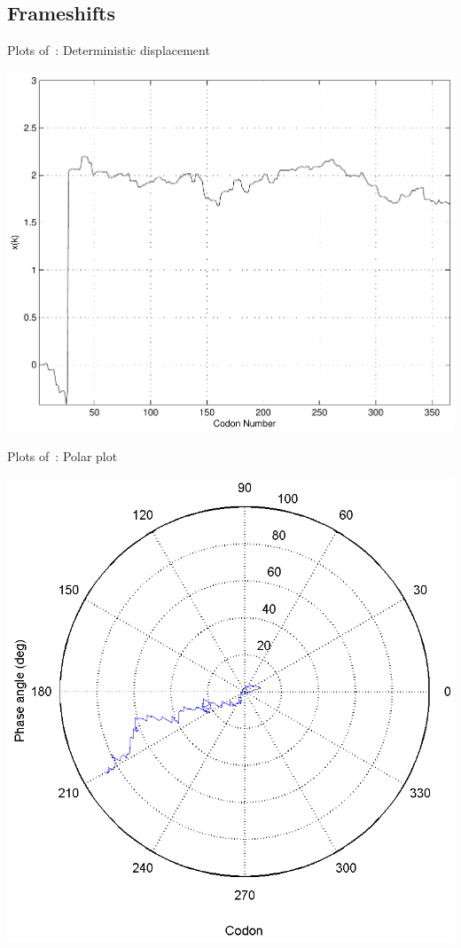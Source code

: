\documentclass[twocolumn, article, oneside]{memoir}
\begin{document}
\subsection{Frameshifts}
\label{section:frameshifts}

\begin{cfigure}
  \caption{Plots of~\prfB: Deterministic displacement}
  \label{prfB:deterministic:sub}
  \includegraphics[width=\linewidth]{prfB/deterministic}
\end{cfigure}

\begin{cfigure}
  \caption{Plots of~\prfB: Polar plot}
  \label{prfB:polar:sub}
  \includegraphics[width=\linewidth]{prfB/polar}
\end{cfigure}
\end{document}
